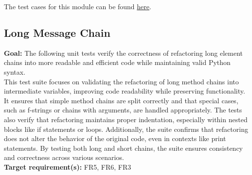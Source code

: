 \documentclass[12pt, titlepage]{article}
\begin{document}
\noindent The test cases for this module can be found \href{https://github.com/ssm-lab/capstone--source-code-optimizer/blob/new-poc/tests/refactorers/test_repeated_calls.py}{here}.

\subsection{Long Message Chain}

\textbf{Goal:} The following unit tests verify the correctness of refactoring long element chains into more readable and efficient code while maintaining valid Python syntax.\\

\noindent This test suite focuses on validating the refactoring of long method chains into 
intermediate variables, improving code readability while preserving functionality. 
It ensures that simple method chains are split correctly and that special cases, 
such as f-strings or chains with arguments, are handled appropriately. The tests 
also verify that refactoring maintains proper indentation, especially within nested 
blocks like if statements or loops. Additionally, the suite confirms that 
refactoring does not alter the behavior of the original code, even in contexts 
like print statements. By testing both long and short chains, the suite ensures 
consistency and correctness across various scenarios.\\

\noindent \textbf{Target requirement(s):} FR5, FR6, FR3 ~\cite{SRS} \\
\end{document}
